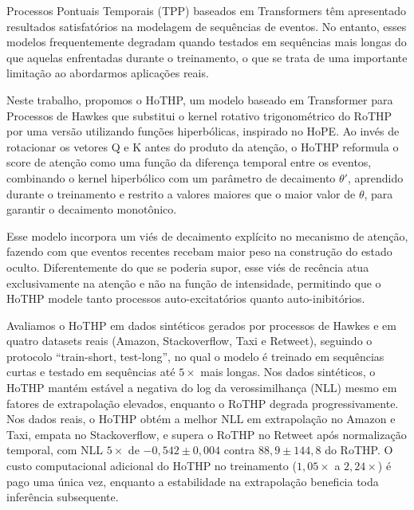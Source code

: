 Processos Pontuais Temporais (\gls{TPP}) baseados em Transformers têm apresentado resultados satisfatórios na modelagem de sequências de eventos. No entanto, esses modelos frequentemente degradam quando testados em sequências mais longas do que aquelas enfrentadas durante o treinamento, o que se trata de uma importante limitação ao abordarmos aplicações reais.

Neste trabalho, propomos o HoTHP, um modelo baseado em Transformer para Processos de Hawkes que substitui o kernel rotativo trigonométrico do RoTHP por uma versão utilizando funções hiperbólicas, inspirado no HoPE. Ao invés de rotacionar os vetores Q e K antes do produto da atenção, o HoTHP reformula o score de atenção como uma função da diferença temporal entre os eventos, combinando o kernel hiperbólico com um parâmetro de decaimento $\theta'$, aprendido durante o treinamento e restrito a valores maiores que o maior valor de $\theta$, para garantir o decaimento monotônico.

Esse modelo incorpora um viés de decaimento explícito no mecanismo de atenção, fazendo com que eventos recentes recebam maior peso na construção do estado oculto. Diferentemente do que se poderia supor, esse viés de recência atua exclusivamente na atenção e não na função de intensidade, permitindo que o HoTHP modele tanto processos auto-excitatórios quanto auto-inibitórios.

Avaliamos o HoTHP em dados sintéticos gerados por processos de Hawkes e em quatro datasets reais (Amazon, Stackoverflow, Taxi e Retweet), seguindo o protocolo ``train-short, test-long'', no qual o modelo é treinado em sequências curtas e testado em sequências até $5\times$ mais longas. Nos dados sintéticos, o HoTHP mantém estável a negativa do log da verossimilhança (\gls{NLL}) mesmo em fatores de extrapolação elevados, enquanto o RoTHP degrada progressivamente. Nos dados reais, o HoTHP obtém a melhor NLL em extrapolação no Amazon e Taxi, empata no Stackoverflow, e supera o RoTHP no Retweet após normalização temporal, com NLL $5\times$ de $-0{,}542 \pm 0{,}004$ contra $88{,}9 \pm 144{,}8$ do RoTHP. O custo computacional adicional do HoTHP no treinamento ($1{,}05\times$ a $2{,}24\times$) é pago uma única vez, enquanto a estabilidade na extrapolação beneficia toda inferência subsequente.

